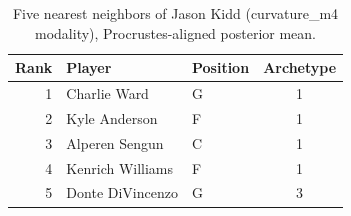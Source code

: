 \begin{table}[htbp]
  \centering\small
  \begin{tabular}{rllc}
    \toprule
    Rank & Player & Position & Archetype \\
    \midrule
    1 & Charlie Ward & G & 1 \\
    2 & Kyle Anderson & F & 1 \\
    3 & Alperen Sengun & C & 1 \\
    4 & Kenrich Williams & F & 1 \\
    5 & Donte DiVincenzo & G & 3 \\
    \bottomrule
  \end{tabular}
  \caption{Five nearest neighbors of Jason Kidd (curvature_m4 modality), Procrustes-aligned posterior mean.}
  \label{tab:Jason_Kidd_neighbors_curvature_m4}
\end{table}

